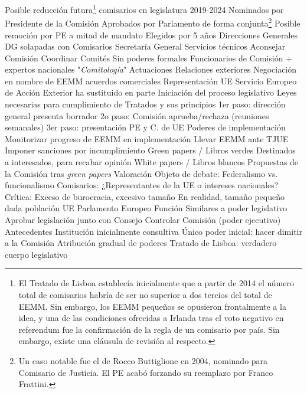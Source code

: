 \documentclass{nuevotema}
\begin{document}
\begin{esquemal}
				\4[] Posible reducción futura\footnote{El Tratado de Lisboa establecía inicialmente que a partir de 2014 el número total de comisarios habría de ser no superior a dos tercios del total de EEMM. Sin embargo, los EEMM pequeños se opusieron frontalmente a la idea, y una de las condiciones ofrecidas a Irlanda tras el voto negativo en referendum fue la confirmación de la regla de un comisario por país. Sin embargo, existe una cláusula de revisión al respecto.}
				 comisarios en legislatura 2019-2024
				\4[] Nominados por Presidente de la Comisión
				\4[] Aprobados por Parlamento de forma conjunta\footnote{Un caso notable fue el de Rocco Buttiglione en 2004, nominado para Comisario de Justicia. El PE acabó forzando su reemplazo por Franco Frattini.}
				\4[] Posible remoción por PE a mitad de mandato
				\4[] Elegidos por 5 años
				\4[] Direcciones Generales
				 DG solapadas con Comisarios
				\4 Secretaría General
				\4[] Servicios técnicos
				\4[] Aconsejar Comisión
				\4[] Coordinar
				\4 Comités
				\4[] Sin poderes formales
				\4[] Funcionarios de Comisión + expertos nacionales
				\4[] "\textit{Comitología}"
			\3 Actuaciones
				\4 Relaciones exteriores
				\4[] Negociación en nombre de EEMM acuerdos comerciales
				\4[] Representación UE
				\4[] Servicio Europeo de Acción Exterior ha sustituido en parte
				\4 Iniciación del proceso legislativo
				\4[] Leyes necesarias para cumplimiento de Tratados y sus principios
				\4[] 1er paso: dirección general presenta borrador
				\4[] 2o paso: Comisión aprueba/rechaza (reuniones semanales)
				\4[] 3er paso: presentación PE y C. de UE
				\4 Poderes de implementación
				\4[] Monitorizar progreso de EEMM en implementación
				\4[] Llevar EEMM ante TJUE
				\4[] Imponer sanciones por incumplimiento
				\4 Green papers / Libros verdes
				\4[] Destinados a interesados, para recabar opinión
				\4 White papers / Libros blancos
				\4[] Propuestas de la Comisión tras \textit{green papers}
			\3 Valoración
				\4 Objeto de debate:
				\4[] Federalismo vs. funcionalismo
				\4 Comisarios:
				\4[] ¿Representantes de la UE o intereses nacionales?
				\4 Crítica:
				\4[] Exceso de burocracia, excesivo tamaño
				\4[] En realidad, tamaño pequeño dada población UE
		\2 Parlamento Europeo
			\3 Función
				\4 Similares a poder legislativo
				\4 Aprobar legislación junto con Consejo
				\4 Controlar Comisión (poder ejecutivo)
			\3 Antecedentes
				\4 Institución inicialmente consultiva
				\4 Único poder inicial: hacer dimitir a la Comisión
				\4 Atribución gradual de poderes
				\4 Tratado de Lisboa: verdadero cuerpo legislativo

\end{esquemal}
\end{document}
